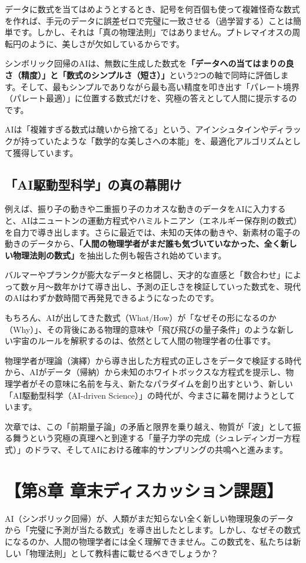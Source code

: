 データに数式を当てはめようとするとき、記号を何百個も使って複雑怪奇な数式を作れば、手元のデータに誤差ゼロで完璧に一致させる（過学習する）ことは簡単です。しかし、それは「真の物理法則」ではありません。プトレマイオスの周転円のように、美しさが欠如しているからです。

シンボリック回帰のAIは、無数に生成した数式を\textbf{「データへの当てはまりの良さ（精度）」と「数式のシンプルさ（短さ）」}という2つの軸で同時に評価します。そして、最もシンプルでありながら最も高い精度を叩き出す「パレート境界（パレート最適）」に位置する数式だけを、究極の答えとして人間に提示するのです。

AIは「複雑すぎる数式は醜いから捨てる」という、アインシュタインやディラックが持っていたような「数学的な美しさへの本能」を、最適化アルゴリズムとして獲得しています。

\subsection{「AI駆動型科学」の真の幕開け}

例えば、振り子の動きや二重振り子のカオスな動きのデータをAIに入力すると、AIはニュートンの運動方程式やハミルトニアン（エネルギー保存則の数式）を自力で導き出します。さらに最近では、未知の天体の動きや、新素材の電子の動きのデータから、\textbf{「人間の物理学者がまだ誰も気づいていなかった、全く新しい物理法則の数式」}を抽出した例も報告され始めています。

バルマーやプランクが膨大なデータと格闘し、天才的な直感と「数合わせ」によって数ヶ月〜数年かけて導き出し、予測の正しさを検証していった数式を、現代のAIはわずか数時間で再発見できるようになったのです。

もちろん、AIが出してきた数式（What/How）が「なぜその形になるのか（Why）」、その背後にある物理的意味や「飛び飛びの量子条件」のような新しい宇宙のルールを解釈するのは、依然として人間の物理学者の仕事です。

物理学者が理論（演繹）から導き出した方程式の正しさをデータで検証する時代から、AIがデータ（帰納）から未知のホワイトボックスな方程式を提示し、物理学者がその意味に名前を与え、新たなパラダイムを創り出すという、新しい「AI駆動型科学（AI-driven Science）」の時代が、今まさに幕を開けようとしています。

次章では、この「前期量子論」の矛盾と限界を乗り越え、物質が「波」として振る舞うという究極の真理へと到達する「量子力学の完成（シュレディンガー方程式）」のドラマ、そしてAIにおける確率的サンプリングの共鳴へと進みます。

\section*{【第8章 章末ディスカッション課題】}

AI（シンボリック回帰）が、人類がまだ知らない全く新しい物理現象のデータから「完璧に予測が当たる数式」を導き出したとします。しかし、なぜその数式になるのか、人間の物理学者には全く理解できません。この数式を、私たちは新しい「物理法則」として教科書に載せるべきでしょうか？




